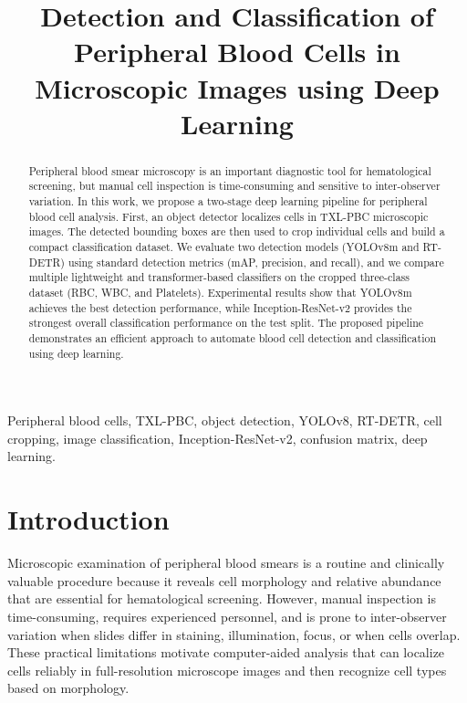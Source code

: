 \documentclass[conference]{IEEEtran}
\begin{document}
\title{Detection and Classification of Peripheral Blood Cells in Microscopic Images using Deep Learning}

\author{
}

\maketitle

\begin{abstract}
Peripheral blood smear microscopy is an important diagnostic tool for hematological screening, but manual cell inspection is time-consuming and sensitive to inter-observer variation. In this work, we propose a two-stage deep learning pipeline for peripheral blood cell analysis. First, an object detector localizes cells in TXL-PBC microscopic images. The detected bounding boxes are then used to crop individual cells and build a compact classification dataset. We evaluate two detection models (YOLOv8m and RT-DETR) using standard detection metrics (mAP, precision, and recall), and we compare multiple lightweight and transformer-based classifiers on the cropped three-class dataset (RBC, WBC, and Platelets). Experimental results show that YOLOv8m achieves the best detection performance, while Inception-ResNet-v2 provides the strongest overall classification performance on the test split. The proposed pipeline demonstrates an efficient approach to automate blood cell detection and classification using deep learning.
\end{abstract}

\begin{IEEEkeywords}
Peripheral blood cells, TXL-PBC, object detection, YOLOv8, RT-DETR, cell cropping, image classification, Inception-ResNet-v2, confusion matrix, deep learning.
\end{IEEEkeywords}

\section{Introduction}

Microscopic examination of peripheral blood smears is a routine and clinically valuable procedure because it reveals cell morphology and relative abundance that are essential for hematological screening. However, manual inspection is time-consuming, requires experienced personnel, and is prone to inter-observer variation when slides differ in staining, illumination, focus, or when cells overlap. These practical limitations motivate computer-aided analysis that can localize cells reliably in full-resolution microscope images and then recognize cell types based on morphology.
\end{document}
